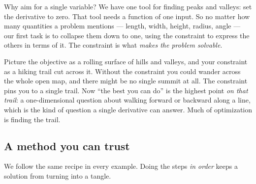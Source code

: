 Why aim for a single variable? We have one tool for finding peaks and valleys: set
the derivative to zero. That tool needs a function of one input. So no matter how many
quantities a problem mentions --- length, width, height, radius, angle --- our first
task is to collapse them down to one, using the constraint to express the others in
terms of it. The constraint is what \emph{makes the problem solvable}.

\begin{intuitionbox}
Picture the objective as a rolling surface of hills and valleys, and your constraint as
a hiking trail cut across it. Without the constraint you could wander across the whole
open map, and there might be no single summit at all. The constraint pins you to a
single trail. Now ``the best you can do'' is the highest point \emph{on that
trail}: a one-dimensional question about walking forward or backward along a line,
which is the kind of question a single derivative can answer. Much of optimization is
finding the trail.
\end{intuitionbox}

\subsection{A method you can trust}

We follow the same recipe in every example. Doing the steps \emph{in order} keeps
a solution from turning into a tangle.

